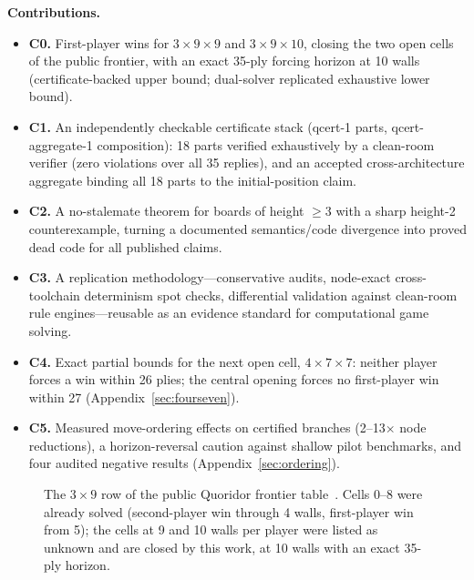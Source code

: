 \documentclass[conference]{IEEEtran}
\newcommand{\varSpec}[3]{$#1{\times}#2{\times}#3$}
\begin{document}
\textbf{Contributions.}
\begin{itemize}[leftmargin=*]
\item \textbf{C0.} First-player wins for \varSpec{3}{9}{9} and \varSpec{3}{9}{10}, closing the two open cells of the public frontier, with an exact 35-ply forcing horizon at 10 walls (certificate-backed upper bound; dual-solver replicated exhaustive lower bound).
\item \textbf{C1.} An independently checkable certificate stack (\textsf{qcert-1} parts, \textsf{qcert-aggregate-1} composition): 18 parts verified exhaustively by a clean-room verifier (zero violations over all 35 replies), and an accepted cross-architecture aggregate binding all 18 parts to the initial-position claim.
\item \textbf{C2.} A no-stalemate theorem for boards of height $\geq 3$ with a sharp height-2 counterexample, turning a documented semantics/code divergence into proved dead code for all published claims.
\item \textbf{C3.} A replication methodology---conservative audits, node-exact cross-toolchain determinism spot checks, differential validation against clean-room rule engines---reusable as an evidence standard for computational game solving.
\item \textbf{C4.} Exact partial bounds for the next open cell, \varSpec{4}{7}{7}: neither player forces a win within 26 plies; the central opening forces no first-player win within 27 (Appendix~\ref{sec:fourseven}).
\item \textbf{C5.} Measured move-ordering effects on certified branches (2--13$\times$ node reductions), a horizon-reversal caution against shallow pilot benchmarks, and four audited negative results (Appendix~\ref{sec:ordering}).
\end{itemize}

\begin{figure}[t]
\centering
{}
\caption{The $3\times 9$ row of the public Quoridor frontier table~\cite{slatton2026solving}. Cells 0--8 were already solved (second-player win through 4 walls, first-player win from 5); the cells at 9 and 10 walls per player were listed as unknown and are closed by this work, at 10 walls with an exact 35-ply horizon.}
\label{fig:frontier}
\end{figure}
\end{document}
